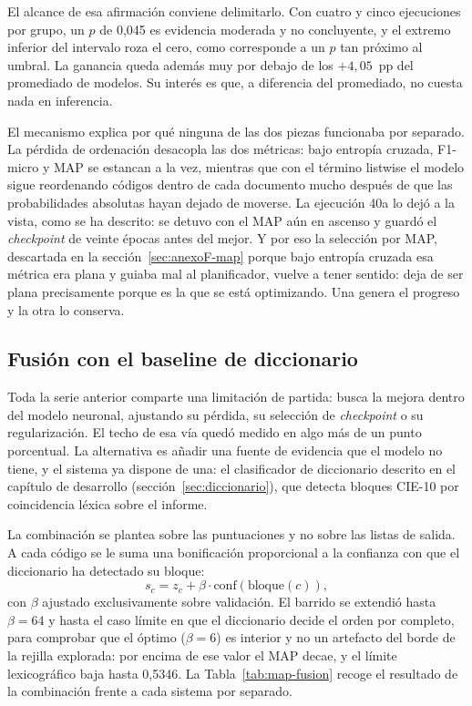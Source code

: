 El alcance de esa afirmación conviene delimitarlo. Con cuatro y cinco ejecuciones por grupo, un $p$ de 0{,}045 es evidencia moderada y no concluyente, y el extremo inferior del intervalo roza el cero, como corresponde a un $p$ tan próximo al umbral. La ganancia queda además muy por debajo de los $+4{,}05$~pp del promediado de modelos. Su interés es que, a diferencia del promediado, no cuesta nada en inferencia.

El mecanismo explica por qué ninguna de las dos piezas funcionaba por separado. La pérdida de ordenación desacopla las dos métricas: bajo entropía cruzada, F1-micro y MAP se estancan a la vez, mientras que con el término listwise el modelo sigue reordenando códigos dentro de cada documento mucho después de que las probabilidades absolutas hayan dejado de moverse. La ejecución 40a lo dejó a la vista, como se ha descrito: se detuvo con el MAP aún en ascenso y guardó el \emph{checkpoint} de veinte épocas antes del mejor. Y por eso la selección por MAP, descartada en la sección~\ref{sec:anexoF-map} porque bajo entropía cruzada esa métrica era plana y guiaba mal al planificador, vuelve a tener sentido: deja de ser plana precisamente porque es la que se está optimizando. Una genera el progreso y la otra lo conserva.

\subsection{Fusión con el baseline de diccionario}
\label{sec:anexoF-fusion}

Toda la serie anterior comparte una limitación de partida: busca la mejora dentro del modelo neuronal, ajustando su pérdida, su selección de \emph{checkpoint} o su regularización. El techo de esa vía quedó medido en algo más de un punto porcentual. La alternativa es añadir una fuente de evidencia que el modelo no tiene, y el sistema ya dispone de una: el clasificador de diccionario descrito en el capítulo de desarrollo (sección~\ref{sec:diccionario}), que detecta bloques CIE-10 por coincidencia léxica sobre el informe.

La combinación se plantea sobre las puntuaciones y no sobre las listas de salida. A cada código se le suma una bonificación proporcional a la confianza con que el diccionario ha detectado su bloque:
\[
s_c = z_c + \beta \cdot \text{conf}(\text{bloque}(c)),
\]
con $\beta$ ajustado exclusivamente sobre validación. El barrido se extendió hasta $\beta = 64$ y hasta el caso límite en que el diccionario decide el orden por completo, para comprobar que el óptimo ($\beta = 6$) es interior y no un artefacto del borde de la rejilla explorada: por encima de ese valor el MAP decae, y el límite lexicográfico baja hasta 0{,}5346. La Tabla~\ref{tab:map-fusion} recoge el resultado de la combinación frente a cada sistema por separado.


